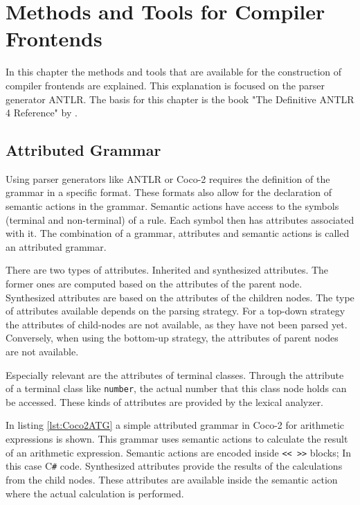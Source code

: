 \chapter{Methods and Tools for Compiler Frontends}

In this chapter the methods and tools that are available for the construction of compiler frontends are explained. This explanation is focused on the parser generator ANTLR. The basis for this chapter is the book "The Definitive ANTLR 4 Reference" by \textcite{Antlr4Reference}.

\section{Attributed Grammar}

Using parser generators like ANTLR or Coco-2 requires the definition of the grammar in a specific format. These formats also allow for the declaration of semantic actions in the grammar. Semantic actions have access to the symbols (terminal and non-terminal) of a rule. Each symbol then has attributes associated with it. The combination of a grammar, attributes and semantic actions is called an attributed grammar.  


There are two types of attributes. Inherited and synthesized attributes. The former ones are computed based on the attributes of the parent node. Synthesized attributes are based on the attributes of the children nodes.  
The type of attributes available depends on the parsing strategy. For a top-down strategy the attributes of child-nodes are not available, as they have not been parsed yet. Conversely, when using the bottom-up strategy, the attributes of parent nodes are not available. 

Especially relevant are the attributes of terminal classes. Through the attribute of a terminal class like \texttt{number}, the actual number that this class node holds can be accessed. These kinds of attributes are provided by the lexical analyzer. 

In listing \ref{lst:Coco2ATG} a simple attributed grammar in Coco-2 for arithmetic expressions is shown. This grammar uses semantic actions to calculate the result of an arithmetic expression. Semantic actions are encoded inside \lstinline{<< >>} blocks; In this case C\verb|#| code. Synthesized attributes provide the results of the calculations from the child nodes. These attributes are available inside the semantic action where the actual calculation is performed. 

